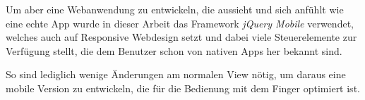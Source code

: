 Um aber eine Webanwendung zu entwickeln, die aussieht und sich \glqq anfühlt\grqq{} wie eine echte App wurde in dieser Arbeit das Framework \emph{jQuery Mobile} verwendet, welches auch auf Responsive Webdesign setzt und dabei viele Steuerelemente zur Verfügung stellt, die dem Benutzer schon von nativen Apps her bekannt sind.\par

So sind lediglich wenige Änderungen am normalen View nötig, um daraus eine mobile Version zu entwickeln, die für die Bedienung mit dem Finger optimiert ist.